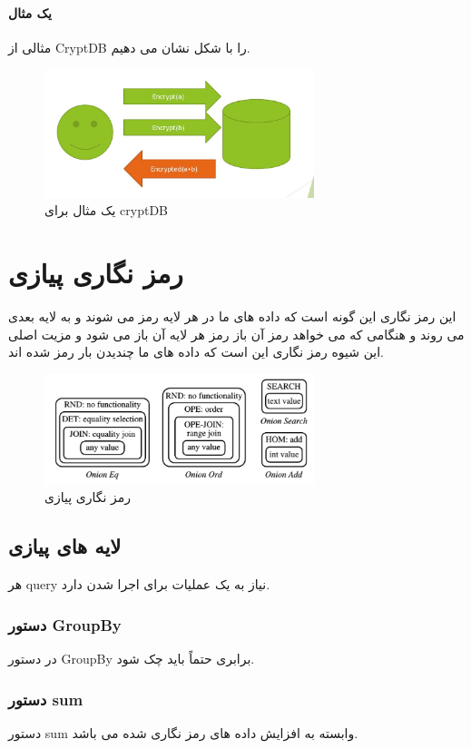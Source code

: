 \documentclass[a4paper]{article}
\begin{document}
			\paragraph{یک مثال}
			مثالی از 
			CryptDB 
			را  با شکل نشان می دهیم.
				\begin{figure}[h]
					\centering
					\includegraphics[width=0.7\textwidth]{im3.jpg}
					\caption{یک مثال برای cryptDB}
				\end{figure}
			
			
			\section{رمز نگاری پیازی}
			این رمز نگاری این گونه است که داده های ما در هر لایه رمز می شوند و به لایه بعدی می روند و هنگامی که می خواهد رمز آن باز رمز هر لایه آن باز می شود و مزیت اصلی این شیوه رمز نگاری این است که داده های ما چندیدن بار رمز شده اند.
				\begin{figure}[h]
					\centering
					\includegraphics[width=0.7\textwidth]{im2.jpg}
					\caption{رمز نگاری پیازی}
				\end{figure}
			
			\subsection{لایه های پیازی}
			هر 
			query
			نیاز به یک عملیات برای اجرا شدن دارد.
			\subsubsection{دستور GroupBy}
			در دستور 
			GroupBy
			برابری حتماً باید چک شود.
			
			\subsubsection{دستور sum}
			دستور 
			sum
			وابسته به افزایش داده های رمز نگاری شده می باشد.
			
\end{document}
